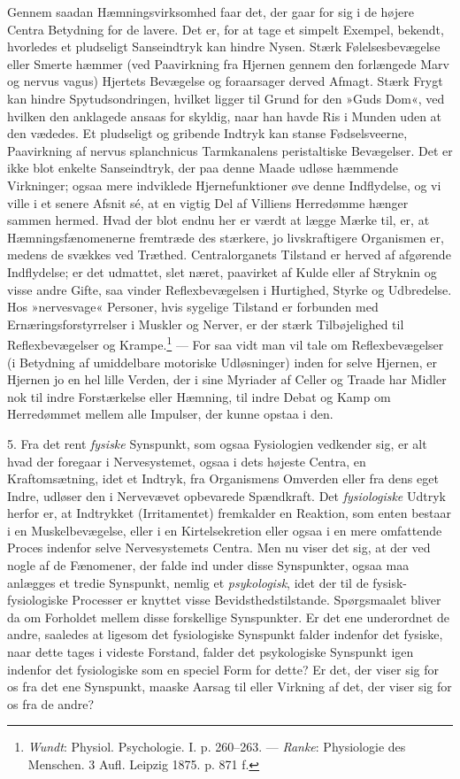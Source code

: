 \documentclass[12pt,a4paper,openany]{book}
\newcommand{\opage}[1]{\marginnote{\footnotesize\textit{[#1]}}}
\begin{document}
Gennem saadan Hæmningsvirksomhed faar det, der gaar for sig i de højere
Centra Betydning for de lavere. Det er, for at tage et simpelt Exempel,
bekendt, hvorledes et pludseligt Sanseindtryk kan hindre Nysen. Stærk
Følelsesbevægelse eller Smerte hæmmer (ved Paavirkning fra Hjernen
gennem den forlængede Marv og nervus vagus) Hjertets Bevægelse og
foraarsager derved Afmagt. Stærk Frygt kan hindre Spytudsondringen,
hvilket ligger til Grund for den »Guds Dom«, ved hvilken den anklagede
ansaas for skyldig, naar han havde Ris i Munden uden at den vædedes. Et
pludseligt og gribende Indtryk kan stanse Fødselsveerne, Paavirkning af
nervus splanchnicus Tarmkanalens peristaltiske Bevægelser. Det er ikke
blot enkelte Sanseindtryk, der paa denne Maade udløse hæmmende
Virkninger; ogsaa mere indviklede Hjernefunktioner øve denne
Indflydelse, og vi ville i et senere Afsnit sé, at en vigtig Del af
Villiens Herredømme hænger sammen hermed. Hvad der blot endnu her er
værdt at lægge Mærke til, er, at Hæmningsfænomenerne fremtræde des
stærkere, jo livskraftigere Organismen er, medens de svækkes ved
Træthed. Centralorganets Tilstand er herved af afgørende Indflydelse; er
det udmattet, slet næret, paavirket af Kulde eller af Stryknin og visse
andre Gifte, saa vinder Reflexbevægelsen i Hurtighed, Styrke og
Udbredelse. Hos »nervesvage« Personer, hvis sygelige Tilstand er
forbunden med Ernæringsforstyrrelser i Muskler og Nerver, er der stærk
Tilbøjelighed til Reflexbevægelser og Krampe.\footnote[2]{\emph{Wundt}:
Physiol. Psychologie. I. p. 260--263. --- \emph{Ranke}: Physiologie des
Menschen. 3 Aufl. Leipzig 1875. p. 871 f.} --- For saa vidt man vil tale
om Reflexbevægelser (i Betydning af umiddelbare motoriske Udløsninger)
inden for selve Hjernen, er Hjernen jo en hel lille Verden, der i sine
Myriader af Celler og Traade har Midler nok til indre Forstærkelse eller
Hæmning, til indre Debat og Kamp om Herredømmet mellem alle Impulser,
der kunne opstaa i den.


\opage{54}5. Fra det rent \emph{fysiske} Synspunkt, som ogsaa
Fysiologien vedkender sig, er alt hvad der foregaar i Nervesystemet,
ogsaa i dets højeste Centra, en Kraftomsætning, idet et Indtryk, fra
Organismens Omverden eller fra dens eget Indre, udløser den i Nervevævet
opbevarede Spændkraft. Det \emph{fysiologiske} Udtryk herfor er, at
Indtrykket (Irritamentet) fremkalder en Reaktion, som enten bestaar i en
Muskelbevægelse, eller i en Kirtelsekretion eller ogsaa i en mere
omfattende Proces indenfor selve Nervesystemets Centra. Men nu viser det
sig, at der ved nogle af de Fænomener, der falde ind under disse
Synspunkter, ogsaa maa anlægges et tredie Synspunkt, nemlig et
\emph{psykologisk}, idet der til de fysisk-fysiologiske Processer er
knyttet visse Bevidsthedstilstande. Spørgsmaalet bliver da om Forholdet
mellem disse forskellige Synspunkter. Er det ene underordnet de andre,
saaledes at ligesom det fysiologiske Synspunkt falder indenfor det
fysiske, naar dette tages i videste Forstand, falder det psykologiske
Synspunkt igen indenfor det fysiologiske som en speciel Form for dette?
Er det, der viser sig for os fra det ene Synspunkt, maaske Aarsag til
eller Virkning af det, der viser sig for os fra de andre?
\end{document}
